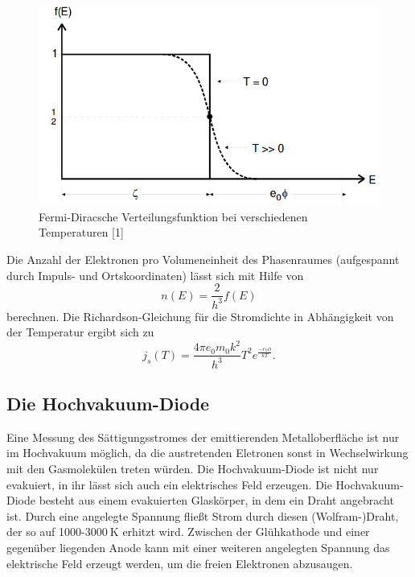 \documentclass[11pt,ngerman,a4paper]{article}
\begin{document}
\begin{figure}[H]
\centering
\includegraphics[scale=0.5]{abb1.png}
\caption{Fermi-Diracsche Verteilungsfunktion bei verschiedenen Temperaturen [1]}
\label{funktion}
\end{figure}
Die Anzahl der Elektronen pro Volumeneinheit des Phasenraumes (aufgespannt durch Impuls- und Ortskoordinaten) lässt sich mit Hilfe von
\begin{equation}
n(E) = \frac{2}{h^3}f(E)
\end{equation}
berechnen. Die Richardson-Gleichung für die Stromdichte in Abhängigkeit von der Temperatur ergibt sich zu
\begin{equation}
j_s(T) = \frac{4\pi e_0 m_0 k^2}{h^3} T^2 e^{\frac{-e_0 \phi}{k T}}.
\end{equation}
\subsection{Die Hochvakuum-Diode}
Eine Messung des Sättigungsstromes der emittierenden Metalloberfläche ist nur im Hochvakuum möglich, da die austretenden Eletronen sonst in Wechselwirkung mit den Gasmolekülen treten würden. Die Hochvakuum-Diode ist nicht nur evakuiert, in ihr lässt sich auch ein elektrisches Feld erzeugen.\newline
Die Hochvakuum-Diode besteht aus einem evakuierten Glaskörper, in dem ein Draht angebracht ist. Durch eine angelegte Spannung fließt Strom durch diesen (Wolfram-)Draht, der so auf 1000-$\SI{3000}{\kelvin}$ erhitzt wird. Zwischen der Glühkathode und einer gegenüber liegenden Anode kann mit einer weiteren angelegten Spannung das elektrische Feld erzeugt werden, um die freien Elektronen abzusaugen.
\end{document}
